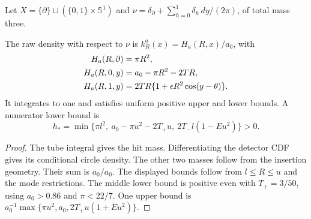 Let $X=\{\partial\}\sqcup(\{0,1\}\times\mathbb S^1)$ and
$\nu=\delta_\partial+\sum_{h=0}^1\delta_h\,dy/(2\pi)$, of total mass three.
\begin{proposition}\label{prop:raw}
The raw density with respect to $\nu$ is $k_R^a(x)=H_a(R,x)/a_0$, with
\begin{align}
 H_a(R,\partial)&=\pi R^2,\notag\\
 H_a(R,0,y)&=a_0-\pi R^2-2TR,\notag\\
 H_a(R,1,y)&=2TR\{1+\epsilon R^2\cos(y-\theta)\}.
 \label{eq:raw}
\end{align}
It integrates to one and satisfies uniform positive upper and lower bounds. A numerator lower bound is
\[
 h_* =\min\{\pi l^2,\ a_0-\pi u^2-2T_+u,\ 2T_-l(1-Eu^2)\}>0.
\]
\end{proposition}
\begin{proof}
The tube integral gives the hit mass. Differentiating the detector CDF gives its conditional circle density. The other two masses follow from the insertion geometry. Their sum is $a_0/a_0$. The displayed bounds follow from $l\le R\le u$ and the mode restrictions. The middle lower bound is positive even with $T_+=3/50$, using $a_0>0.86$ and $\pi<22/7$. One upper bound is $a_0^{-1}\max\{\pi u^2,a_0,2T_+u(1+Eu^2)\}$.
\end{proof}

